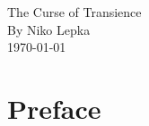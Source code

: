 \documentclass[a4paper]{book}
\begin{document}
\begin{titlepage}
    \begin{center}
        \LARGE{The Curse of Transience}\\
        \Large{By Niko Lepka}\\
        \large{\today}
    \end{center}
\end{titlepage}
\thispagestyle{empty}
\frontmatter
\chapter*{Preface}
\tableofcontents
\mainmatter
\end{document}
